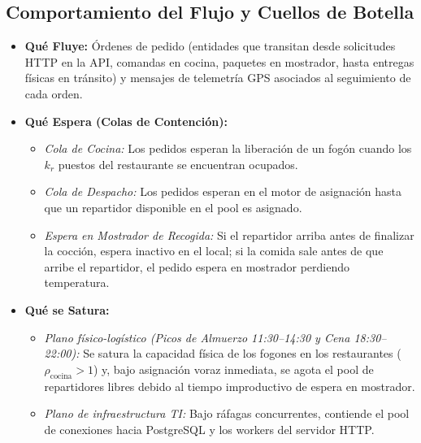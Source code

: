 \documentclass[11pt,letterpaper]{article}
\begin{document}
\subsection{Comportamiento del Flujo y Cuellos de Botella}
\begin{itemize}[leftmargin=1.5em, itemsep=0.3em]
    \item \textbf{Qué Fluye:} Órdenes de pedido (entidades que transitan desde solicitudes HTTP en la API, comandas en cocina, paquetes en mostrador, hasta entregas físicas en tránsito) y mensajes de telemetría GPS asociados al seguimiento de cada orden.
    \item \textbf{Qué Espera (Colas de Contención):}
    \begin{itemize}[leftmargin=1.2em]
        \item \textit{Cola de Cocina:} Los pedidos esperan la liberación de un fogón cuando los $k_r$ puestos del restaurante se encuentran ocupados.
        \item \textit{Cola de Despacho:} Los pedidos esperan en el motor de asignación hasta que un repartidor disponible en el pool es asignado.
        \item \textit{Espera en Mostrador de Recogida:} Si el repartidor arriba antes de finalizar la cocción, espera inactivo en el local; si la comida sale antes de que arribe el repartidor, el pedido espera en mostrador perdiendo temperatura.
    \end{itemize}
    \item \textbf{Qué se Satura:}
    \begin{itemize}[leftmargin=1.2em]
        \item \textit{Plano físico-logístico (Picos de Almuerzo 11:30–14:30 y Cena 18:30–22:00):} Se satura la capacidad física de los fogones en los restaurantes ($\rho_{\text{cocina}} > 1$) y, bajo asignación voraz inmediata, se agota el pool de repartidores libres debido al tiempo improductivo de espera en mostrador.
        \item \textit{Plano de infraestructura TI:} Bajo ráfagas concurrentes, contiende el pool de conexiones hacia PostgreSQL y los workers del servidor HTTP.
    \end{itemize}
\end{itemize}
\end{document}
